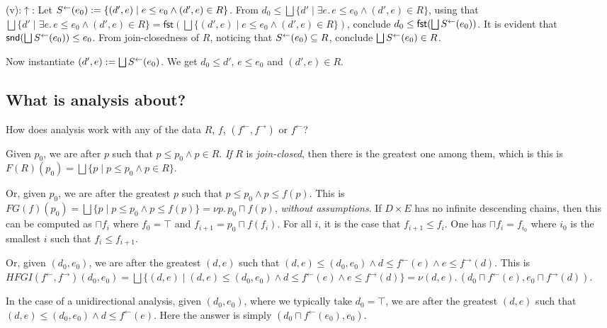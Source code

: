 \documentclass[9pt]{article}
\newcommand{\ff}{{f^{\rightarrow}}}
\newcommand{\fb}{{f^{\leftarrow}}}
\newcommand{\bigjoin}{\bigsqcup}
\newcommand{\meet}{\sqcap}
\newcommand{\bigmeet}{\sqcap}  %
\newcommand{\con}{\wedge}
\newcommand{\fst}{\mathsf{fst}}
\newcommand{\snd}{\mathsf{snd}}
\begin{document}

(v):$\uparrow$: Let
$\Sb(e_0) := \{(d',e) \mid e \leq e_0 \con (d', e) \in R\}$. From
$d_0 \leq \bigjoin \{d' \mid \exists e.\, e \leq e_0 \con (d',e)
\in R\}$, using that
$\bigjoin \{d' \mid \exists e.\, e \leq e_0 \con (d',e) \in R\}
= \fst (\bigjoin \{(d',e) \mid e \leq e_0 \con (d', e) \in
R\})$, conclude $d_0 \leq \fst(\bigjoin \Sb(e_0))$. It is evident that
$\snd(\bigjoin \Sb(e_0)) \leq e_0$. From join-closedness of $R$, noticing that
$S^\leftarrow(e_0) \subseteq R$, conclude $\bigjoin \Sb(e_0) \in R$.

Now instantiate $(d',e) := \bigjoin \Sb(e_0)$. We get $d_0 \leq d'$, $e
\leq e_0$ and $(d',e) \in R$.




\subsection*{What is analysis about?}

How does analysis work with any of the data $R$, $f$, $(\fb,\ff)$ or $\fb$?

Given $p_0$, we are after $p$ such that $p \leq p_0 \con p \in
R$. \emph{If} $R$ is \emph{join-closed}, then there is the greatest one
among them, which is this is
$F(R)(p_0) = \bigjoin \{ p \mid p \leq p_0 \con p \in R\}$.

Or, given $p_0$, we are after the greatest $p$ such that
$p \leq p_0 \con p \leq f(p)$. This is
$FG(f)(p_0) = \bigjoin \{ p \mid p \leq p_0 \con p \leq f(p) \} = \nu p.\, p_0
\meet f(p)$, \emph{without assumptions}.  If $D \times E$ has no
infinite descending chains, then this can be computed as
$\bigmeet f_i$ where $f_0 = \top$ and $f_{i+1} = p_0 \meet
f(f_i)$. For all $i$, it is the case that $f_{i+1} \leq f_i$. One has
$\bigmeet f_i = f_{i_0}$ where $i_0$ is the smallest $i$ such that
$f_i \leq f_{i+1}$.

Or, given $(d_0,e_0)$, we are after the greatest $(d,e)$ such that
$(d,e) \leq (d_0,e_0) \con d \leq \fb(e) \con e \leq \ff(d)$.  This is
$HFGI(\fb,\ff)(d_0,e_0) = \bigjoin \{(d,e) \mid (d,e) \leq (d_0,e_0) \con d \leq \fb(e) \con e \leq
\ff(d)\} = \nu (d,e).\, (d_0 \meet \fb(e),e_0 \meet \ff(d))$.

In the case of a unidirectional analysis, given $(d_0,e_0)$, where
we typically take $d_0 = \top$, we are after the greatest $(d,e)$ such
that $(d,e) \leq (d_0,e_0) \con d \leq \fb(e)$.
Here the answer is simply $(d_0 \meet \fb(e_0), e_0)$.
\end{document}
